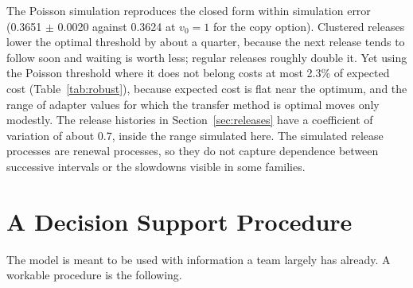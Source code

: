 \documentclass[preprint,12pt,authoryear]{elsarticle}
\begin{document}
The Poisson simulation reproduces the closed form within simulation error (0.3651 $\pm$ 0.0020 against 0.3624 at $v_0=1$ for the copy option). Clustered releases lower the optimal threshold by about a quarter, because the next release tends to follow soon and waiting is worth less; regular releases roughly double it. Yet using the Poisson threshold where it does not belong costs at most 2.3\% of expected cost (Table~\ref{tab:robust}), because expected cost is flat near the optimum, and the range of adapter values for which the transfer method is optimal moves only modestly. The release histories in Section~\ref{sec:releases} have a coefficient of variation of about 0.7, inside the range simulated here. The simulated release processes are renewal processes, so they do not capture dependence between successive intervals or the slowdowns visible in some families.

\section{A Decision Support Procedure}\label{sec:practice}

The model is meant to be used with information a team largely has already. A workable procedure is the following.
\end{document}
